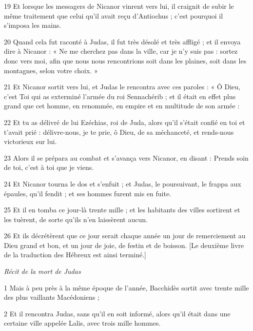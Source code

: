 \par 19 Et lorsque les messagers de Nicanor vinrent vers lui, il craignit de subir le même traitement que celui qu'il avait reçu d'Antiochus ; c'est pourquoi il s'imposa les mains.

\par 20 Quand cela fut raconté à Judas, il fut très désolé et très affligé ; et il envoya dire à Nicanor : « Ne me cherchez pas dans la ville, car je n’y suis pas : sortez donc vers moi, afin que nous nous rencontrions soit dans les plaines, soit dans les montagnes, selon votre choix. »

\par 21 Et Nicanor sortit vers lui, et Judas le rencontra avec ces paroles : « Ô Dieu, c'est Toi qui as exterminé l'armée du roi Sennachérib ; et il était en effet plus grand que cet homme, en renommée, en empire et en multitude de son armée :

\par 22 Et tu as délivré de lui Ezéchias, roi de Juda, alors qu'il s'était confié en toi et t'avait prié : délivre-nous, je te prie, ô Dieu, de sa méchanceté, et rends-nous victorieux sur lui.

\par 23 Alors il se prépara au combat et s'avança vers Nicanor, en disant : Prends soin de toi, c'est à toi que je viens.

\par 24 Et Nicanor tourna le dos et s'enfuit ; et Judas, le poursuivant, le frappa aux épaules, qu'il fendit ; et ses hommes furent mis en fuite.

\par 25 Et il en tomba ce jour-là trente mille ; et les habitants des villes sortirent et les tuèrent, de sorte qu'ils n'en laissèrent aucun.

\par 26 Et ils décrétèrent que ce jour serait chaque année un jour de remerciement au Dieu grand et bon, et un jour de joie, de festin et de boisson. [Le deuxième livre de la traduction des Hébreux est ainsi terminé.]


\par \textit{Récit de la mort de Judas}

\par 1 Mais à peu près à la même époque de l'année, Bacchidès sortit avec trente mille des plus vaillants Macédoniens ;

\par 2 Et il rencontra Judas, sans qu'il en soit informé, alors qu'il était dans une certaine ville appelée Lalis, avec trois mille hommes.

